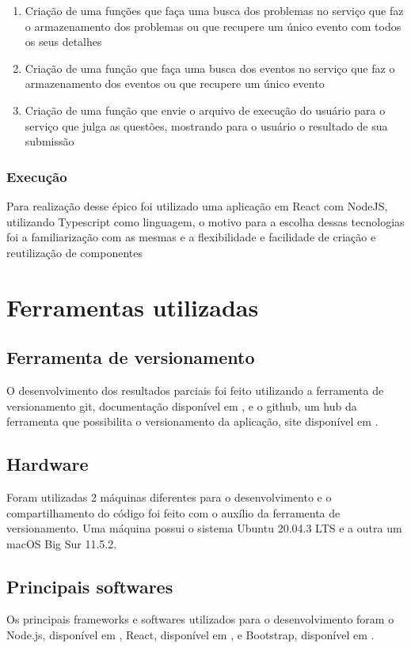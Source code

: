 \begin{enumerate}
          \begin{enumerate}
              \item Criação de uma funções que faça uma busca dos problemas no serviço que faz o armazenamento dos problemas ou que recupere um único evento com todos os seus detalhes
              \item Criação de uma função que faça uma busca dos eventos no serviço que faz o armazenamento dos eventos ou que recupere um único evento
              \item Criação de uma função que envie o arquivo de execução do usuário para o serviço que julga as questões, mostrando para o usuário o resultado de sua submissão
          \end{enumerate}
\end{enumerate}

\subsubsection{Execução}

Para realização desse épico foi utilizado uma aplicação em React com NodeJS, utilizando Typescript como linguagem, o motivo para a escolha dessas tecnologias foi a familiarização com as mesmas e a flexibilidade e facilidade de criação e reutilização de componentes

\section{Ferramentas utilizadas}

\subsection{Ferramenta de versionamento}

O desenvolvimento dos resultados parciais foi feito utilizando a ferramenta de versionamento git, documentação disponível em \cite{doc:git}, e o github, um hub da ferramenta que possibilita o versionamento da aplicação, site disponível em \cite{github}.

\subsection{Hardware}

Foram utilizadas 2 máquinas diferentes para o desenvolvimento e o compartilhamento do código foi feito com o auxílio da ferramenta de versionamento. Uma máquina possui o sistema Ubuntu 20.04.3 LTS e a outra um macOS Big Sur 11.5.2.

\subsection{Principais softwares}

Os principais frameworks e softwares utilizados para o desenvolvimento foram o Node.js, disponível em \cite{nodejs},  React, disponível em \cite{react}, e Bootstrap, disponível em \cite{reactbootstrap}.
